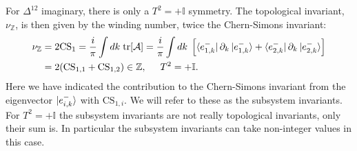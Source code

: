 For $\Delta^{12}$ imaginary, there is only a $T^2 = + \mathbb{I}$ symmetry. The topological invariant, $\nu_{\mathbb{Z}}$, is then given by the winding number, twice the Chern-Simons invariant:
\begin{align}
\nu_{\mathbb{Z}} &= 2\text{CS}_1 = \frac{i}{\pi} \int dk\; \text{tr}[\mathcal{A}] = \frac{i}{\pi} \int dk\; \left[\bra{e^{-}_{1,k}}\partial_k\ket{e^{-}_{1,k}} + \bra{e^{-}_{2,k}}\partial_k\ket{e^{-}_{2,k}}  \right] \nonumber \\
 &= 2(\text{CS}_{1,1} + \text{CS}_{1,2})\in \mathbb{Z}, \hspace{0.5cm} T^2 = +\mathbb{I}.
\label{eq.2wires.topinv.T2eqplus1}
\end{align}
Here we have indicated the contribution to the Chern-Simons invariant from the eigenvector $\ket{e^{-}_{i,k}}$ with $\text{CS}_{1,i}$. We will refer to these as the subsystem invariants. For $T^2 = +\mathbb{I}$ the subsystem invariants are not really topological invariants, only their sum is. In particular the subsystem invariants can take non-integer values in this case. 

